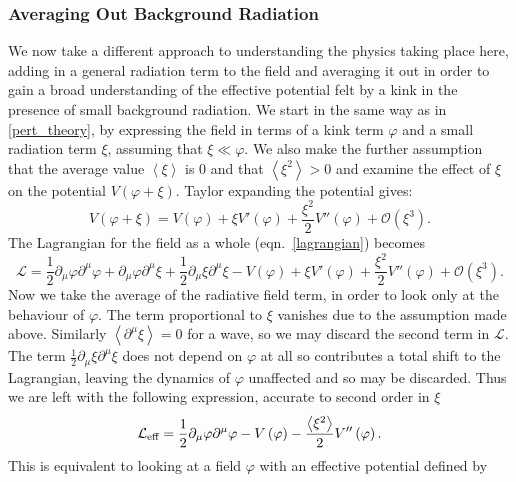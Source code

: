\documentclass[11pt, oneside,titlepage]{article}  	%
\numberwithin{equation}{section}
\begin{document}
\subsubsection{Averaging Out Background Radiation} \label{avg_out}
We now take a different approach to understanding the physics taking place here,  adding in a general radiation term to the field and averaging it out in order to gain a broad understanding of the effective potential felt by a kink in the presence of small background radiation. We start in the same way as in \textsection \ref{pert_theory}, by expressing the field in terms of a kink term $\varphi$ and a small radiation term $\xi$, assuming that $\xi \ll \varphi$. We also make the further assumption that the average value $\left \langle\xi\right \rangle$ is 0 and that $\left \langle\xi ^ 2\right \rangle > 0$ and examine the effect of $\xi$ on the potential $V(\varphi+\xi)$. Taylor expanding the potential gives:
\begin{equation}
V\left ( \varphi+\xi \right ) = V\left ( \varphi \right ) + \xi V'\left ( \varphi \right ) + \frac{\xi^2}{2}V''\left ( \varphi \right ) + \mathcal{O}(\xi^3).
\end{equation}
The Lagrangian for the field as a whole (eqn.~\ref{lagrangian}) becomes
\begin{equation}
\mathcal{L} = \frac{1}{2} \partial_\mu \varphi \partial^\mu \varphi + \partial_\mu \varphi \partial^\mu \xi + \frac{1}{2} \partial_\mu \xi\partial^\mu \xi- V\left ( \varphi \right ) + \xi V'\left ( \varphi \right ) + \frac{\xi^2}{2}V''\left ( \varphi \right ) + \mathcal{O}(\xi^3).
\end{equation} 
Now we take the average of the radiative field term, in order to look only at the behaviour of $\varphi$. The term proportional to $\xi$ vanishes due to the assumption made above. Similarly $\left \langle \partial^\mu \xi\right \rangle = 0$ for a wave, so we may discard the second term in $\mathcal{L}$. The term $ \frac{1}{2} \partial_\mu \xi\partial^\mu \xi$ does not depend on $\varphi$ at all so contributes a total shift to the Lagrangian, leaving the dynamics of $\varphi$ unaffected and so may be discarded. Thus we are left with the following expression, accurate to second order in $\xi$ 
\begin{equation}
\mathcal{L}_{\textup{eff}} = \frac{1}{2} \partial_\mu \varphi \partial^\mu \varphi - V\left ( \varphi \right ) - \frac{\left \langle \xi^2 \right \rangle}{2}V''\left ( \varphi \right ) .
\end{equation} 
This is equivalent to looking at a field $\varphi$ with an effective potential defined by
\end{document}
